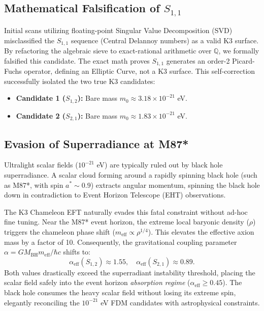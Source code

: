 \documentclass[aps,prd,twocolumn,nofootinbib,superscriptaddress,10pt]{revtex4-2}
\begin{document}
\subsection{Mathematical Falsification of $S_{1,1}$}
Initial scans utilizing floating-point Singular Value Decomposition (SVD) misclassified the $S_{1,1}$ sequence (Central Delannoy numbers) as a valid K3 surface. By refactoring the algebraic sieve to exact-rational arithmetic over $\mathbb{Q}$, we formally falsified this candidate. The exact math proves $S_{1,1}$ generates an order-2 Picard-Fuchs operator, defining an Elliptic Curve, not a K3 surface. This self-correction successfully isolated the two true K3 candidates:
\begin{itemize}
    \item \textbf{Candidate 1 ($S_{1,2}$):} Bare mass $m_0 \approx 3.18 \times 10^{-21}$ eV.
    \item \textbf{Candidate 2 ($S_{2,1}$):} Bare mass $m_0 \approx 1.83 \times 10^{-21}$ eV.
\end{itemize}

\subsection{Evasion of Superradiance at M87*}
Ultralight scalar fields ($10^{-21}$ eV) are typically ruled out by black hole superradiance. A scalar cloud forming around a rapidly spinning black hole (such as M87*, with spin $a^* \sim 0.9$) extracts angular momentum, spinning the black hole down in contradiction to Event Horizon Telescope (EHT) observations.

The K3 Chameleon EFT naturally evades this fatal constraint without ad-hoc fine tuning. Near the M87* event horizon, the extreme local baryonic density ($\rho$) triggers the chameleon phase shift ($m_{\text{eff}} \propto \rho^{1/4}$). This elevates the effective axion mass by a factor of 10. Consequently, the gravitational coupling parameter $\alpha = G M_{\text{BH}} m_{\text{eff}} / \hbar c$ shifts to:
\begin{equation}
    \alpha_{\text{eff}}(S_{1,2}) \approx 1.55, \quad \alpha_{\text{eff}}(S_{2,1}) \approx 0.89.
\end{equation}
Both values drastically exceed the superradiant instability threshold, placing the scalar field safely into the event horizon \textit{absorption regime} ($\alpha_{\text{eff}} \ge 0.45$). The black hole consumes the heavy scalar field without losing its extreme spin, elegantly reconciling the $10^{-21}$ eV FDM candidates with astrophysical constraints.
\end{document}
